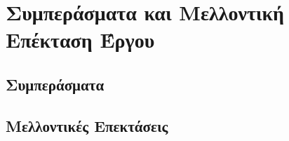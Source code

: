 \documentclass[../main.tex]{subfiles}
\begin{document}
    

\section{Συμπεράσματα και Μελλοντική Επέκταση Έργου}

\subsection{Συμπεράσματα}
\subsection{Μελλοντικές Επεκτάσεις}
\clearpage
\end{document}
